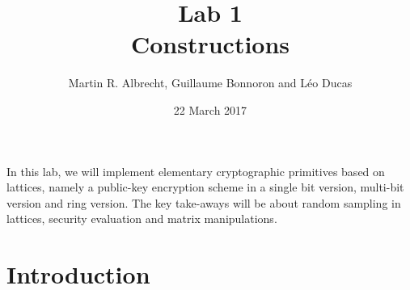 \documentclass[10pt,a4paper,nobib]{tufte-handout}
\author{Martin R. Albrecht, Guillaume Bonnoron and Léo Ducas}
\date{22 March 2017}
\title{Lab 1\\\medskip
\large Constructions}
\begin{document}
\maketitle
In this lab, we will implement elementary cryptographic primitives based on lattices, namely a public-key encryption scheme in a single bit version, multi-bit version and ring version. The key take-aways will be about random sampling in lattices, security evaluation and matrix manipulations. 

%
%
%
%
%
%

\section{Introduction}\label{sec:orgaad38e1}
\end{document}
